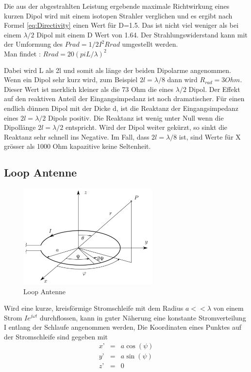 Die aus der abgestrahlten Leistung ergebende maximale Richtwirkung eines kurzen Dipol wird  mit einem isotopen Strahler verglichen und es ergibt nach Formel \ref{eq:Directivity} einen Wert für D=1.5. Das ist nicht viel weniger als bei einem $\lambda/2$ Dipol mit einem D Wert von 1.64.
Der Strahlungswiderstand kann mit der Umformung des $Prad=1/2 I^{2}Rrad$ umgestellt werden. \\
Man findet :
$Rrad=20\left(piL/\lambda\right)^{2}$

Dabei wird L als 2l und somit als länge der beiden Dipolarme angenommen.
Wenn ein Dipol sehr kurz wird, zum Beispiel $2l=\lambda/8$ dann wird $R_{rad} = 3 Ohm$. Dieser Wert ist merklich kleiner als die 73 Ohm die  eines $\lambda/2$ Dipol. Der Effekt auf den reaktiven Anteil der Eingangsimpedanz ist noch dramatischer. Für einen endlich dünnen Dipol mit der Dicke d, ist die Reaktanz der Eingangsimpedanz eines $2l=\lambda/2$ Dipols positiv. Die Reaktanz ist wenig unter Null wenn die Dipollänge  $2l=\lambda/2$ entspricht. Wird der Dipol weiter gekürzt, so sinkt die Reaktanz sehr schnell  ins Negative. Im Fall, dass $2l=\lambda/8$ ist,  sind Werte für X grösser als 1000 Ohm kapazitive keine Seltenheit. 


\subsection{Loop Antenne}\label{sec:LoopAntenneTheorie}

\begin{figure}[!htb]
	\centering
	\includegraphics[width=7cm]{content/bilder/Loop_EMANT_S45.pdf}%
	\caption{Loop Antenne}
	\label{LoopAntenne}
\end{figure}


Wird eine kurze, kreisförmige Stromschleife mit dem Radius $a<<\lambda$ von einem Strom $Ie^{j\omega t}$ durchflossen,  kann in guter Näherung eine konstante Stromverteilung I entlang der Schlaufe angenommen werden,
Die Koordinaten eines Punktes auf der Stromschleife sind gegeben mit
\begin{eqnarray}
x’ &=&a \cos(\psi)\\
y’ &=&a \sin(\psi)\\
z’ &=&0
\end{eqnarray}


